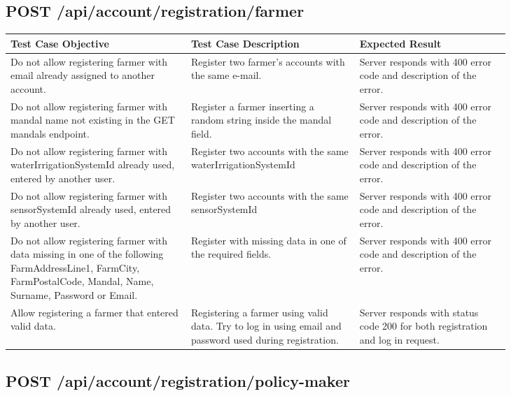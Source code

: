 \subsection{POST \slash api\slash account\slash registration\slash farmer}
\begin{longtable}{p{0.30\linewidth}p{0.28\linewidth}p{0.25\linewidth}}
	\toprule
	\textbf{Test Case Objective}   & \textbf{Test Case Description} & \textbf{Expected Result}\\
	\midrule
	Do not allow registering farmer with email already assigned to another account. & Register two farmer's accounts with the same e-mail. & Server responds with 400 error code and description of the error. \\
	\midrule
	Do not allow registering farmer with mandal name not existing in the GET mandals endpoint. & Register a farmer inserting a random string inside the mandal field. & Server responds with 400 error code and description of the error.\\
	\midrule
	Do not allow registering farmer with waterIrrigationSystemId already used, entered by another user. & Register two accounts with the same waterIrrigationSystemId & Server responds with 400 error code and description of the error.\\
	\midrule
 	Do not allow registering farmer with sensorSystemId already used, entered by another user. & Register two accounts with the same sensorSystemId & Server responds with 400 error code and description of the error.\\
 	\midrule
	 Do not allow registering farmer with data missing in one of the following FarmAddressLine1, FarmCity, FarmPostalCode, Mandal, Name, Surname, Password or Email. & Register with missing data in one of the required fields. & Server responds with 400 error code and description of the error.\\
	 \midrule
	 Allow registering a farmer that entered valid data. & Registering a farmer using valid data. Try to log in using email and password used during registration. & Server responds with status code 200 for both registration and log in request.\\
	\bottomrule
\end{longtable}

\subsection{POST \slash api\slash account\slash registration\slash policy-maker}

